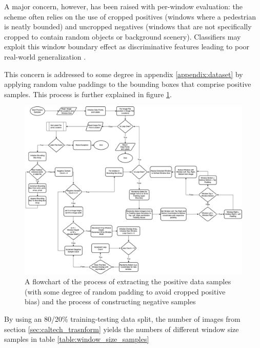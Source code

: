 A major concern, however, has been raised with per-window evaluation: the scheme often relies on the use of cropped positives (windows where a pedestrian is neatly bounded) and uncropped negatives (windows that are not specifically cropped to contain random objects or background scenery). Classifiers may exploit this window boundary effect as discriminative features leading to poor real-world generalization \cite{dollar_2009_pedestrian}.

This concern is addressed to some degree in appendix \ref{appendix:dataset} by applying random value paddings to the bounding boxes that comprise positive samples. This process is further explained in figure \ref{fig:dataset_low}.

\begin{figure}
    \centering
    \includegraphics[width=\linewidth]{images/ee_dataset_low.drawio (1).png}
    \caption{A flowchart of the process of extracting the positive data samples (with some degree of random padding to avoid cropped positive bias) and the process of constructing negative samples }
    \label{fig:dataset_low}
\end{figure}

By using an 80/20\% training-testing data split, the number of images from section \ref{sec:caltech_trasnform} yields the numbers of different window size samples in table \ref{table:window_size_samples}

